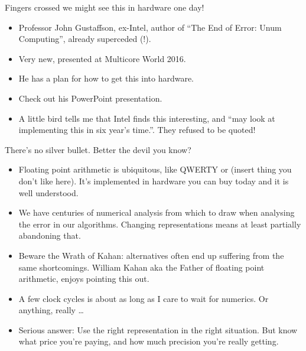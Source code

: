 \documentclass{beamer}
\begin{document}
\begin{frame}{Fingers crossed we might see this in hardware one day!}
\begin{itemize}
\item Professor John Gustaffson, ex-Intel, author of ``The End of Error: Unum Computing'',
			already superceded (!).
\item Very new, presented at Multicore World 2016.
\item He has a plan for how to get this into hardware.
\item Check out his PowerPoint presentation.
\item A little bird tells me that Intel finds this interesting, and ``may look at implementing this in
			six year's time.''. They refused to be quoted!
\end{itemize}
\end{frame}


\begin{frame}{There's no silver bullet. Better the devil you know?}
\begin{itemize}
\item Floating point arithmetic is ubiquitous, like QWERTY or (insert thing
			you don't like here). It's implemented in hardware you can buy today and it is well understood.
\item We have centuries of numerical analysis from which to draw when analysing the error in our algorithms.
			Changing representations means at least partially abandoning that.
\item Beware the Wrath of Kahan: alternatives often end up suffering from the same shortcomings. 
			William Kahan aka the Father of floating point arithmetic, enjoys pointing this out.
\item A few clock cycles is about as long as I care to wait for numerics. Or anything, really \ldots
\item Serious answer: Use the right representation in the right situation. But know what price you're 
			paying, and how much precision you're really getting.
\end{itemize}
\end{frame}
\end{document}
